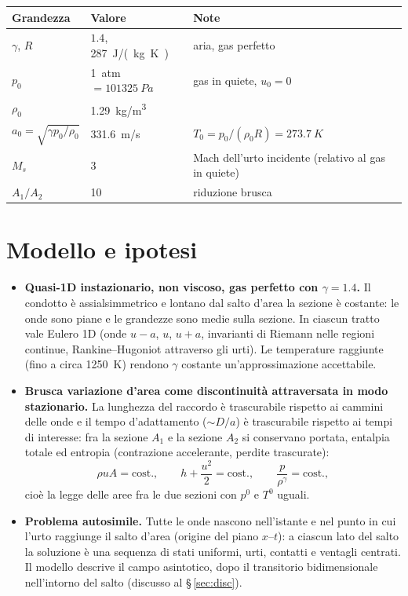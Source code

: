 \documentclass[11pt,a4paper]{article}
\newcommand{\uma}{u-a}
\newcommand{\upa}{u+a}
\begin{document}
\begin{table}[H]
  \centering
  \begin{tabular}{lll}
    \toprule
    Grandezza & Valore & Note \\
    \midrule
    $\gamma$, $R$ & $\num{1.4}$, \SI{287}{J/(kg.K)} & aria, gas perfetto \\
    $p_0$ & \SI{1}{atm} $=\SI{101325}{Pa}$ & gas in quiete, $u_0=0$ \\
    $\rho_0$ & \SI{1.29}{kg/m^3} & \\
    $a_0=\sqrt{\gamma p_0/\rho_0}$ & \SI{331.6}{m/s} & $T_0=p_0/(\rho_0R)=\SI{273.7}{K}$ \\
    $M_s$ & 3 & Mach dell'urto incidente (relativo al gas in quiete) \\
    $A_1/A_2$ & 10 & riduzione brusca \\
    \bottomrule
  \end{tabular}
\end{table}

\section{Modello e ipotesi}
\begin{itemize}
  \item \textbf{Quasi-1D instazionario, non viscoso, gas perfetto con $\gamma=\num{1.4}$.} Il condotto è
    assialsimmetrico e lontano dal salto d'area la sezione è costante: le onde sono piane e le grandezze sono
    medie sulla sezione. In ciascun tratto vale Eulero 1D (onde $\uma$, $u$, $\upa$, invarianti di Riemann nelle
    regioni continue, Rankine--Hugoniot attraverso gli urti). Le temperature raggiunte (fino a circa
    \SI{1250}{K}) rendono $\gamma$ costante un'approssimazione accettabile.
  \item \textbf{Brusca variazione d'area come discontinuità attraversata in modo stazionario.} La lunghezza
    del raccordo è trascurabile rispetto ai cammini delle onde e il tempo d'adattamento ($\sim D/a$) è
    trascurabile rispetto ai tempi di interesse: fra la sezione $A_1$ e la sezione $A_2$ si conservano portata,
    entalpia totale ed entropia (contrazione accelerante, perdite trascurate):
    \[
      \rho u A=\text{cost.},\qquad h+\frac{u^2}{2}=\text{cost.},\qquad \frac{p}{\rho^\gamma}=\text{cost.},
    \]
    cioè la legge delle aree fra le due sezioni con $p^0$ e $T^0$ uguali.
  \item \textbf{Problema autosimile.} Tutte le onde nascono nell'istante e nel punto in cui l'urto raggiunge il
    salto d'area (origine del piano $x$--$t$): a ciascun lato del salto la soluzione è una sequenza di stati
    uniformi, urti, contatti e ventagli centrati. Il modello descrive il campo asintotico, dopo il transitorio
    bidimensionale nell'intorno del salto (discusso al \S\,\ref{sec:disc}).
\end{itemize}
\end{document}
